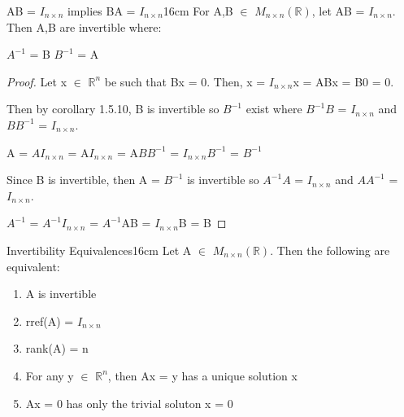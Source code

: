     \newpage



    \begin{wtheorem}{AB = $I_{n \times n}$ implies BA = $I_{n \times n}$}{16cm}
        For A,B $\in$ $M_{n \times n}(\mathbb{R})$,
        let AB = $I_{n \times n}$. Then A,B are invertible where:
        
        \hspace{0.5cm}
        $A^{-1}$ = B
        \hspace{1cm}
        $B^{-1}$ = A
    \end{wtheorem}

    \begin{proof}
        Let x $\in$ $\mathbb{R}^n$ be such that Bx = 0. Then,
        x = $I_{n \times n}$x
        = ABx
        = B0
        = 0.

        Then by {\color{orange} corollary 1.5.10}, B is invertible
        so $B^{-1}$ exist
        where $B^{-1}B$ = $I_{n \times n}$ and $BB^{-1}$ = $I_{n \times n}$.

        \hspace{0.5cm}
        A = $AI_{n \times n}$
        = A$I_{n \times n}$
        = A$BB^{-1}$
        = $I_{n \times n}B^{-1}$
        = $B^{-1}$

        Since B is invertible, then A = $B^{-1}$ is invertible
        so $A^{-1}A$ = $I_{n \times n}$ and $AA^{-1}$ = $I_{n \times n}$.

        \hspace{0.5cm}
        $A^{-1}$ = $A^{-1}I_{n \times n}$
        = $A^{-1}$AB
        = $I_{n \times n}$B
        = B
    \end{proof}

    \vspace{0.5cm}



    \begin{wtheorem}{Invertibility Equivalences}{16cm}
        Let A $\in$ $M_{n \times n}(\mathbb{R})$.
        Then the following are equivalent:

        \begin{enumerate}[label=(\alph*), leftmargin=1cm, itemsep=0.1cm]
            \item A is invertible
            
            \item rref(A) = $I_{n \times n}$
            
            \item rank(A) = n
            
            \item For any y $\in$ $\mathbb{R}^n$, then Ax = y
                has a unique solution x

            \item Ax = 0 has only the trivial soluton x = 0
        \end{enumerate}
    \end{wtheorem}

